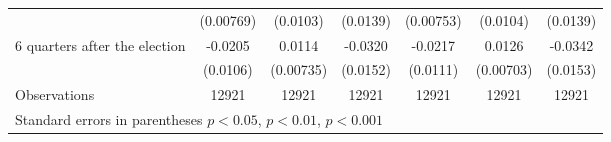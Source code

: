 \begin{table}[!ht]
\begin{tabular}{l*{6}{c}}
                    &   (0.00769)         &    (0.0103)         &    (0.0139)         &   (0.00753)         &    (0.0104)         &    (0.0139)         \\
[0,5em]
 6 quarters after the election&     -0.0205         &      0.0114         &     -0.0320\sym{*}  &     -0.0217         &      0.0126         &     -0.0342\sym{*}  \\
                    &    (0.0106)         &   (0.00735)         &    (0.0152)         &    (0.0111)         &   (0.00703)         &    (0.0153)         \\
\hline
Observations        &       12921         &       12921         &       12921         &       12921         &       12921         &       12921         \\
\hline\hline
\multicolumn{7}{l}{\footnotesize Standard errors in parentheses \sym{*} \(p<0.05\), \sym{**} \(p<0.01\), \sym{***} \(p<0.001\)}\\
\end{tabular}
\end{table}
